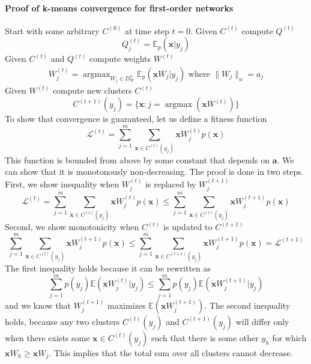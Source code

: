 \documentclass[12pt]{article}
\DeclareMathOperator*{\argmax}{argmax}
\begin{document}
\paragraph{Proof of k-means convergence for first-order networks}
Start with some arbitrary $C^{(0)}$ at time step $t=0$. Given $C^{(t)}$ compute $Q^{(t)}$
\[
Q^{(t)}_j = \mathbb{E}_p(\boldsymbol{x}|y_j)
\]
Given $C^{(t)}$ and $Q^{(t)}$ compute weights $W^{(t)}$
\begin{gather*}
	W_j^{(t)} = \argmax_{W_j\in D_W^{n}} \mathbb{E}_p(\boldsymbol{x}W_j|y_j)\text{ where } \lVert W_j \rVert_u=a_j
\end{gather*}
Given $W^{(t)}$ compute new clusters $C^{(t)}$
\[
C^{(t+1)}(y_j) = \{\boldsymbol{x} : j=\argmax(\boldsymbol{x}W^{(t)})\}
\]
To show that convergence is guaranteed, let us define a fitness function
\[
\mathcal{L}^{(t)} = \sum_{j=1}^m \sum_{\boldsymbol{x}\in C^{(t)}(y_j)} \boldsymbol{x} W_j^{(t)} p(\boldsymbol{x})
\] 
This function is bounded from above by some constant that depends on $\boldsymbol{a}$. We can show that it is monotonously non-decreasing. The proof is done in two steps. First, we show inequality when $W_j^{(t)}$  is replaced by $W_j^{(t+1)}$
\[\mathcal{L}^{(t)}= \sum_{j=1}^m \sum_{\boldsymbol{x}\in C^{(t)}(y_j)} \boldsymbol{x} W_j^{(t)} p(\boldsymbol{x}) \le \sum_{j=1}^m \sum_{\boldsymbol{x}\in C^{(t)}(y_j)} \boldsymbol{x}W_j^{(t+1)} p(\boldsymbol{x})\] 
Second, we show monotonicity when $C^{(t)}$ is updated to $C^{(t+1)}$
\[\sum_{j=1}^m \sum_{\boldsymbol{x}\in C^{(t)}(y_j)} \boldsymbol{x} W_j^{(t+1)} p(\boldsymbol{x}) \le \sum_{j=1}^m \sum_{\boldsymbol{x}\in C^{(t+1)}(y_j)} \boldsymbol{x} W_j^{(t+1)} p(\boldsymbol{x})=\mathcal{L}^{(t+1)}\] 
The first inequality holds because it can be rewritten as
\[\sum_{j=1}^m p(y_j) \mathbb{E}(\boldsymbol{x} W_j^{(t)}|y_j)  \le \sum_{j=1}^m  p(y_j)  \mathbb{E}(\boldsymbol{x}W_j^{(t+1)}|y_j)\] 
and we know that $W_j^{(t+1)}$ maximizes $\mathbb{E}(\boldsymbol{x}W_j^{(t+1)})$.
The second inequality holds, because any two clusters $C^{(t)}(y_j)$ and  $C^{(t+1)}(y_j)$ will differ only when there exists some $\boldsymbol{x}\in C^{(t)}(y_j)$ such that there is some other $y_h$ for which $\boldsymbol{x}W_h \ge \boldsymbol{x} W_j$. This implies that the total sum over all clusters cannot decrease.
\end{document}

